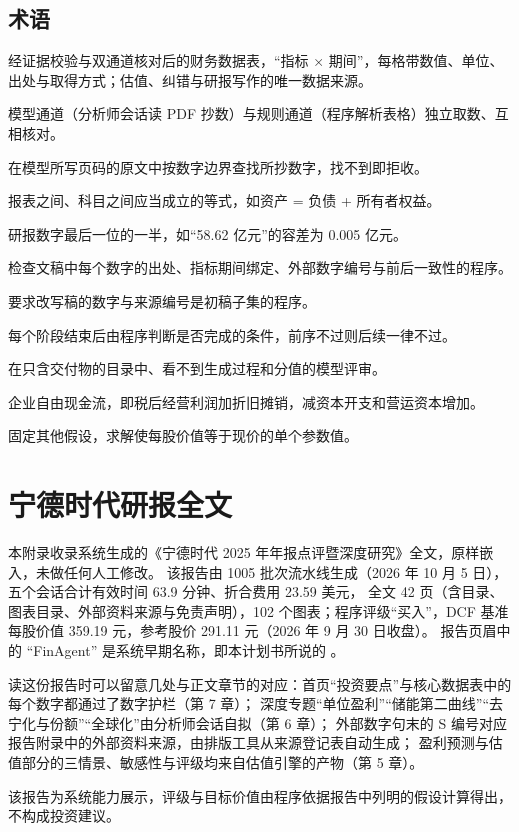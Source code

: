 \section{术语}

\begin{description}[leftmargin=0pt,labelsep=0.6em,font=\heiti\bfseries\color{ink},itemsep=3pt]
  \item[真值表] 经证据校验与双通道核对后的财务数据表，“指标 × 期间”，每格带数值、单位、出处与取得方式；估值、纠错与研报写作的唯一数据来源。
  \item[双通道] 模型通道（分析师会话读 PDF 抄数）与规则通道（程序解析表格）独立取数、互相核对。
  \item[证据校验] 在模型所写页码的原文中按数字边界查找所抄数字，找不到即拒收。
  \item[勾稽] 报表之间、科目之间应当成立的等式，如资产 = 负债 + 所有者权益。
  \item[展示精度容差（$\halfulp$）] 研报数字最后一位的一半，如“58.62 亿元”的容差为 0.005 亿元。
  \item[数字护栏（guard）] 检查文稿中每个数字的出处、指标期间绑定、外部数字编号与前后一致性的程序。
  \item[数字锁（numlock）] 要求改写稿的数字与来源编号是初稿子集的程序。
  \item[闸门] 每个阶段结束后由程序判断是否完成的条件，前序不过则后续一律不过。
  \item[盲评] 在只含交付物的目录中、看不到生成过程和分值的模型评审。
  \item[FCFF] 企业自由现金流，即税后经营利润加折旧摊销，减资本开支和营运资本增加。
  \item[反向 DCF] 固定其他假设，求解使每股价值等于现价的单个参数值。
\end{description}

\chapter{宁德时代研报全文}
\label{app:catl}

本附录收录系统生成的《宁德时代 2025 年年报点评暨深度研究》全文，原样嵌入，未做任何人工修改。
该报告由 1005 批次流水线生成（2026 年 10 月 5 日），五个会话合计有效时间 63.9 分钟、折合费用 23.59 美元，
全文 42 页（含目录、图表目录、外部资料来源与免责声明），102 个图表；程序评级“买入”，DCF 基准每股价值 359.19 元，参考股价 291.11 元（2026 年 9 月 30 日收盘）。
报告页眉中的 “FinAgent” 是系统早期名称，即本计划书所说的 \sysname{}。

读这份报告时可以留意几处与正文章节的对应：首页“投资要点”与核心数据表中的每个数字都通过了数字护栏（第 7 章）；
深度专题“单位盈利”“储能第二曲线”“去宁化与份额”“全球化”由分析师会话自拟（第 6 章）；
外部数字句末的 S 编号对应报告附录中的外部资料来源，由排版工具从来源登记表自动生成；
盈利预测与估值部分的三情景、敏感性与评级均来自估值引擎的产物（第 5 章）。

\begin{note}[声明]
该报告为系统能力展示，评级与目标价值由程序依据报告中列明的假设计算得出，不构成投资建议。
\end{note}



